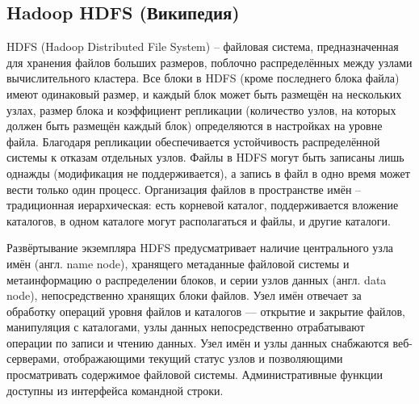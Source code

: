 \documentclass[a4paper,11pt]{article}
\begin{document}
\subsection{Hadoop HDFS (Википедия)}
HDFS (Hadoop Distributed File System) -- файловая система, предназначенная для хранения файлов больших размеров,
поблочно распределённых между узлами вычислительного кластера. Все блоки в HDFS (кроме последнего блока файла) имеют
одинаковый размер, и каждый блок может быть размещён на нескольких узлах, размер блока и коэффициент репликации
(количество узлов, на которых должен быть размещён каждый блок) определяются в настройках на уровне файла. Благодаря
репликации обеспечивается устойчивость распределённой системы к отказам отдельных узлов. Файлы в HDFS могут быть
записаны лишь однажды (модификация не поддерживается), а запись в файл в одно время может вести только один процесс.
Организация файлов в пространстве имён -- традиционная иерархическая: есть корневой каталог, поддерживается вложение
каталогов, в одном каталоге могут располагаться и файлы, и другие каталоги.

Развёртывание экземпляра HDFS предусматривает наличие центрального узла имён (англ. name node), хранящего метаданные
файловой системы и метаинформацию о распределении блоков, и серии узлов данных (англ. data node), непосредственно
хранящих блоки файлов. Узел имён отвечает за обработку операций уровня файлов и каталогов — открытие и закрытие файлов,
манипуляция с каталогами, узлы данных непосредственно отрабатывают операции по записи и чтению данных. Узел имён и узлы
данных снабжаются веб-серверами, отображающими текущий статус узлов и позволяющими просматривать содержимое файловой
системы. Административные функции доступны из интерфейса командной строки.
\end{document}
